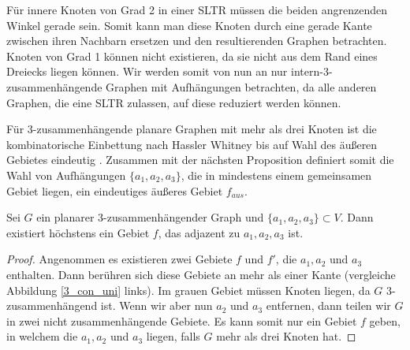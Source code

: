 \begin{remark}
Für innere Knoten von Grad 2 in einer SLTR müssen die beiden angrenzenden Winkel gerade sein. Somit kann man diese Knoten durch eine gerade Kante zwischen ihren Nachbarn ersetzen und den resultierenden Graphen betrachten. Knoten von Grad 1 können nicht existieren, da sie nicht aus dem Rand eines Dreiecks liegen können. Wir werden somit von nun an nur intern-3-zusammenhängende Graphen mit Aufhängungen betrachten, da alle anderen Graphen, die eine SLTR zulassen, auf diese reduziert werden können.
\end{remark}

Für 3-zusammenhängende planare Graphen mit mehr als drei Knoten ist die kombinatorische Einbettung nach Hassler Whitney bis auf Wahl des äußeren Gebietes eindeutig \cite{whitney32}. Zusammen mit der nächsten Proposition definiert somit die Wahl von Aufhängungen $\{a_1,a_2,a_3\}$, die in mindestens einem gemeinsamen Gebiet liegen, ein eindeutiges äußeres Gebiet $f_{aus}$.

\pagebreak

\begin{proposition}
Sei $G$ ein planarer 3-zusammenhängender Graph und $\{a_1,a_2,a_3\} \subset V$. Dann existiert höchstens ein Gebiet $f$, das adjazent zu $a_1,a_2,a_3$ ist.
\end{proposition}

\begin{proof}
Angenommen es existieren zwei Gebiete $f$ und $f'$, die $a_1,a_2$ und $a_3$ enthalten. Dann berühren sich diese Gebiete an mehr als einer Kante (vergleiche Abbildung \ref{3_con_uni} links). Im grauen Gebiet müssen Knoten liegen, da $G$ 3-zusammenhängend ist. Wenn wir aber nun $a_2$ und $a_3$ entfernen, dann teilen wir $G$ in zwei nicht zusammenhängende Gebiete. Es kann somit nur ein Gebiet $f$ geben, in welchem die $a_1,a_2$ und $a_3$ liegen, falls $G$ mehr als drei Knoten hat.
\end{proof}

